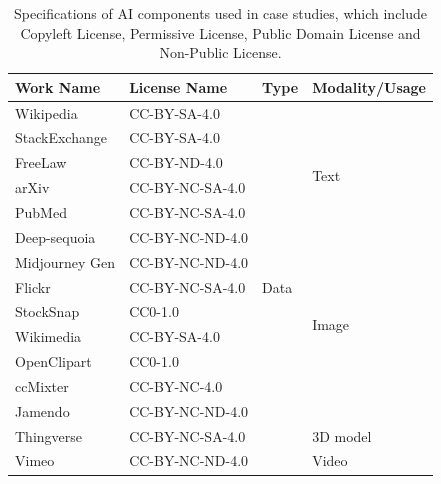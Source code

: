 \begin{table}[h]
  \caption{Specifications of AI components used in case studies, which include \textcolor{Copyleft}{Copyleft License}, \textcolor{Permissive}{Permissive License}, \textcolor{Public}{Public Domain License} and Non-Public License.}
  \vspace{-1mm}
  \footnotesize
  \label{tab:works}
  \begin{tabular}{|p{1.6cm}|p{3cm}|p{0.6cm}|p{1.7cm}|}
      \hline
      \rowcolor[gray]{.8}
      \textbf{Work Name} & \textbf{License Name} & \textbf{Type} & \textbf{Modality/Usage}  \\ \hline
      Wikipedia & \textcolor{Copyleft}{CC-BY-SA-4.0} & \multirow{15}{*}{Data} & \multirow{6}{*}{Text}   \\ \cline{1-2}
      StackExchange & \textcolor{Copyleft}{CC-BY-SA-4.0}  &  &    \\ \cline{1-2}
      FreeLaw & CC-BY-ND-4.0 &  &   \\ \cline{1-2}
      arXiv & \textcolor{Copyleft}{CC-BY-NC-SA-4.0} &  &   \\ \cline{1-2}
      PubMed & \textcolor{Copyleft}{CC-BY-NC-SA-4.0} &  &    \\ \cline{1-2}
      Deep-sequoia & CC-BY-NC-ND-4.0 &  &   \\ \cline{1-2} \cline{4-4}

      Midjourney Gen & CC-BY-NC-ND-4.0 &  & \multirow{6}{*}{Image}  \\ \cline{1-2}
      Flickr & \textcolor{Copyleft}{CC-BY-NC-SA-4.0} &  &   \\ \cline{1-2}
      StockSnap & \textcolor{Public}{CC0-1.0} &  &   \\ \cline{1-2}
      Wikimedia & \textcolor{Copyleft}{CC-BY-SA-4.0} &  &   \\ \cline{1-2}
      OpenClipart & \textcolor{Public}{CC0-1.0} &  &   \\ \cline{1-2} \cline{4-4}
      
      ccMixter & \textcolor{Permissive}{CC-BY-NC-4.0} & & \multirow{2}{*}{Voice}  \\ \cline{1-2}
      Jamendo & CC-BY-NC-ND-4.0 &  &   \\ \cline{1-2} \cline{4-4}
      
      Thingverse & \textcolor{Copyleft}{CC-BY-NC-SA-4.0} &  & 3D model  \\ \cline{1-2} \cline{4-4}

      Vimeo & CC-BY-NC-ND-4.0 &  & Video  \\ \hline


\end{tabular}
\end{table}
